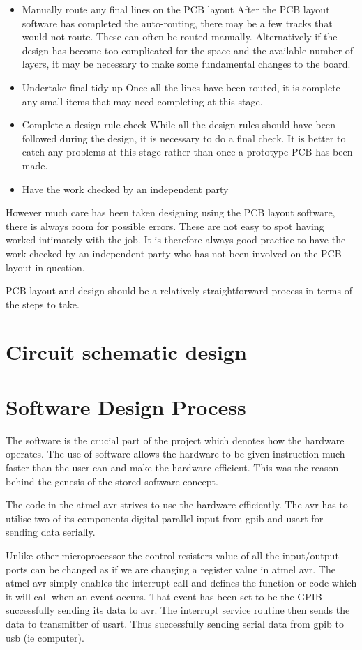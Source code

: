 \documentclass[12pt]{article}
\begin{document}
\begin{itemize}
\item	Manually route any final lines on the PCB layout  
After the PCB layout software has completed the auto-routing, there may be a few tracks that would not route. These can often be routed manually. Alternatively if the design has become too complicated for the space and the available number of layers, it may be necessary to make some fundamental changes to the board.
\item	Undertake final tidy up   
Once all the lines have been routed, it is complete any small items that may need completing at this stage.
\item	Complete a design rule check 
While all the design rules should have been followed during the design, it is necessary to do a final check. It is better to catch any problems at this stage rather than once a prototype PCB has been made.
\item	Have the work checked by an independent party  
\end{itemize}
However much care has been taken designing using the PCB layout software, there is always room for possible errors. These are not easy to spot having worked intimately with the job. It is therefore always good practice to have the work checked by an independent party who has not been involved on the PCB layout in question.

PCB layout and design should be a relatively straightforward process in terms of the steps to take. 
\newpage

\section{Circuit schematic design}
\newpage
\section{Software Design Process}
The software is the crucial part of the project which denotes how the hardware operates. The use of software allows the hardware to be given instruction much faster than the user can and make the hardware efficient. This was the reason behind the genesis of the stored software concept.

The code in the atmel avr strives to use the hardware efficiently. The avr has to utilise two of its components digital parallel input from gpib and usart for sending data serially. 

Unlike other microprocessor the control resisters value of all the input/output ports can be changed as if we are changing a register value in atmel avr. The atmel avr simply enables the interrupt call and defines the function or code which it will call when an event occurs. That event has been set to be the GPIB successfully sending its data to avr.
The interrupt service routine then sends the data to transmitter of usart. Thus successfully sending serial data from gpib to usb (ie computer).
\end{document}
